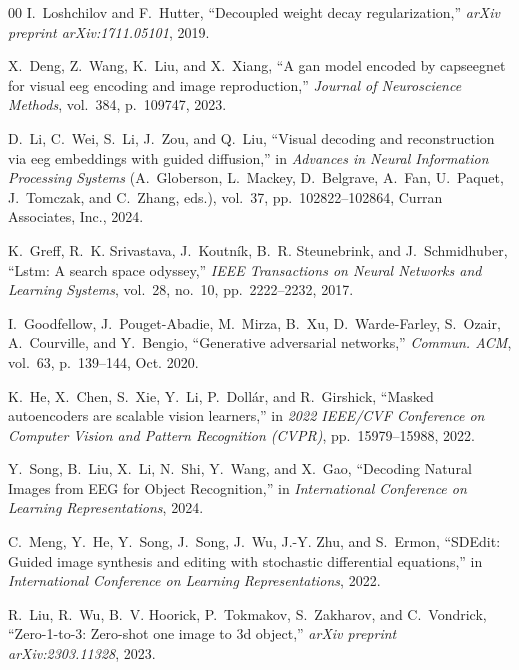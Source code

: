 \documentclass[conference]{IEEEtran}
\begin{document}
\begin{thebibliography}{00}
 I.~Loshchilov and F.~Hutter, ``Decoupled weight decay regularization,'' {\em arXiv preprint arXiv:1711.05101}, 2019.

 X.~Deng, Z.~Wang, K.~Liu, and X.~Xiang, ``A gan model encoded by capseegnet for visual eeg encoding and image reproduction,'' {\em Journal of Neuroscience Methods}, vol.~384, p.~109747, 2023.



 D.~Li, C.~Wei, S.~Li, J.~Zou, and Q.~Liu, ``Visual decoding and reconstruction via eeg embeddings with guided diffusion,'' in {\em Advances in Neural Information Processing Systems} (A.~Globerson, L.~Mackey, D.~Belgrave, A.~Fan, U.~Paquet, J.~Tomczak, and C.~Zhang, eds.), vol.~37, pp.~102822--102864, Curran Associates, Inc., 2024.


 K.~Greff, R.~K. Srivastava, J.~Koutník, B.~R. Steunebrink, and J.~Schmidhuber, ``Lstm: A search space odyssey,'' {\em IEEE Transactions on Neural Networks and Learning Systems}, vol.~28, no.~10, pp.~2222--2232, 2017.



 I.~Goodfellow, J.~Pouget-Abadie, M.~Mirza, B.~Xu, D.~Warde-Farley, S.~Ozair, A.~Courville, and Y.~Bengio, ``Generative adversarial networks,'' {\em Commun. ACM}, vol.~63, p.~139–144, Oct. 2020.



 K.~He, X.~Chen, S.~Xie, Y.~Li, P.~Dollár, and R.~Girshick, ``Masked autoencoders are scalable vision learners,'' in {\em 2022 IEEE/CVF Conference on Computer Vision and Pattern Recognition (CVPR)}, pp.~15979--15988, 2022.



 Y.~Song, B.~Liu, X.~Li, N.~Shi, Y.~Wang, and X.~Gao, ``Decoding {{Natural Images}} from {{EEG}} for {{Object Recognition}},'' in {\em International {{Conference}} on {{Learning Representations}}}, 2024.



C.~Meng, Y.~He, Y.~Song, J.~Song, J.~Wu, J.-Y. Zhu, and S.~Ermon, ``{SDE}dit: Guided image synthesis and editing with stochastic differential equations,'' in {\em International Conference on Learning Representations}, 2022.

R.~Liu, R.~Wu, B.~V. Hoorick, P.~Tokmakov, S.~Zakharov, and C.~Vondrick, ``Zero-1-to-3: Zero-shot one image to 3d object,'' {\em arXiv preprint arXiv:2303.11328}, 2023.





\end{thebibliography}
\end{document}
